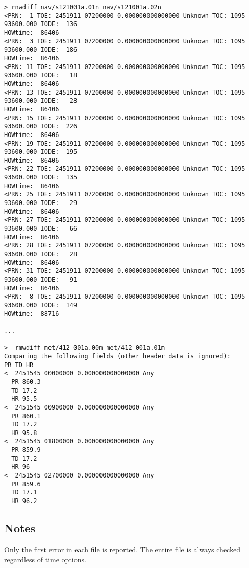 \begin{verbatim}
> rnwdiff nav/s121001a.01n nav/s121001a.02n
<PRN:  1 TOE: 2451911 07200000 0.000000000000000 Unknown TOC: 1095  93600.000 IODE:  136 
HOWtime:  86406
<PRN:  3 TOE: 2451911 07200000 0.000000000000000 Unknown TOC: 1095  93600.000 IODE:  186 
HOWtime:  86406
<PRN: 11 TOE: 2451911 07200000 0.000000000000000 Unknown TOC: 1095  93600.000 IODE:   18 
HOWtime:  86406
<PRN: 13 TOE: 2451911 07200000 0.000000000000000 Unknown TOC: 1095  93600.000 IODE:   28 
HOWtime:  86406
<PRN: 15 TOE: 2451911 07200000 0.000000000000000 Unknown TOC: 1095  93600.000 IODE:  226 
HOWtime:  86406
<PRN: 19 TOE: 2451911 07200000 0.000000000000000 Unknown TOC: 1095  93600.000 IODE:  195 
HOWtime:  86406
<PRN: 22 TOE: 2451911 07200000 0.000000000000000 Unknown TOC: 1095  93600.000 IODE:  135 
HOWtime:  86406
<PRN: 25 TOE: 2451911 07200000 0.000000000000000 Unknown TOC: 1095  93600.000 IODE:   29 
HOWtime:  86406
<PRN: 27 TOE: 2451911 07200000 0.000000000000000 Unknown TOC: 1095  93600.000 IODE:   66 
HOWtime:  86406
<PRN: 28 TOE: 2451911 07200000 0.000000000000000 Unknown TOC: 1095  93600.000 IODE:   28 
HOWtime:  86406
<PRN: 31 TOE: 2451911 07200000 0.000000000000000 Unknown TOC: 1095  93600.000 IODE:   91 
HOWtime:  86406
<PRN:  8 TOE: 2451911 07200000 0.000000000000000 Unknown TOC: 1095  93600.000 IODE:  149 
HOWtime:  88716

...

>  rmwdiff met/412_001a.00m met/412_001a.01m
Comparing the following fields (other header data is ignored):
PR TD HR 
<  2451545 00000000 0.000000000000000 Any
  PR 860.3
  TD 17.2
  HR 95.5
<  2451545 00900000 0.000000000000000 Any
  PR 860.1
  TD 17.2
  HR 95.8
<  2451545 01800000 0.000000000000000 Any
  PR 859.9
  TD 17.2
  HR 96
<  2451545 02700000 0.000000000000000 Any
  PR 859.6
  TD 17.1
  HR 96.2

\end{verbatim}

\subsection{Notes}
Only the first error in each file is reported.  The entire file is always checked regardless of time options.
%